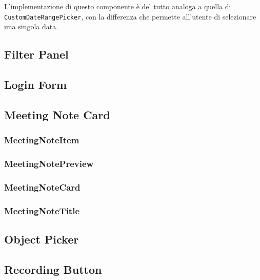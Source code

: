 L'implementazione di questo componente è del tutto analoga a quella di \lstinline{CustomDateRangePicker}, con la differenza che permette all'utente di selezionare una singola data.\\

\subsection{Filter Panel}
\label{subsec:filter-panel}

\subsection{Login Form}
\label{subsec:login-form}

\subsection{Meeting Note Card}
\label{subsec:meeting-note-card}

\subsubsection*{MeetingNoteItem}
\label{subsubsec:meeting-note-item}

\subsubsection*{MeetingNotePreview}
\label{subsubsec:meeting-note-preview}

\subsubsection*{MeetingNoteCard}
\label{subsubsec:meeting-note-card}

\subsubsection*{MeetingNoteTitle}
\label{subsubsec:meeting-note-title}

\subsection{Object Picker}
\label{subsec:object-picker}

\subsection{Recording Button}
\label{subsec:recording-button}

